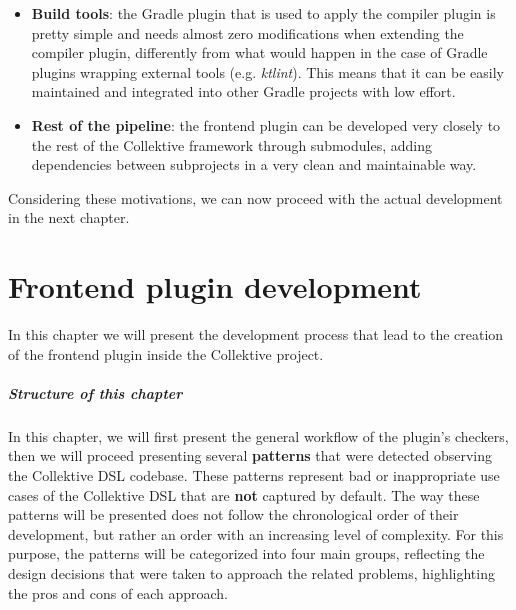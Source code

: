 \documentclass[12pt,a4paper,openright,twoside]{book}
\begin{document}
\begin{enumerate}
\begin{itemize}
    \item \textbf{Build tools}: the Gradle plugin that is used to apply the
    compiler plugin is pretty simple and needs almost zero modifications when
    extending the compiler plugin, differently from what would happen in the
    case of Gradle plugins wrapping external tools (e.g. \emph{ktlint}). This
    means that it can be easily maintained and integrated into other Gradle
    projects with low effort.

    \item \textbf{Rest of the pipeline}: the frontend plugin can be developed 
    very closely to the rest of the Collektive framework through submodules,
    adding dependencies between subprojects in a very clean and maintainable
    way.
  \end{itemize}
\end{enumerate}

Considering these motivations, we can now proceed with the actual development in
the next chapter.

\chapter{Frontend plugin development}
\label{chap:contribution}

In this chapter we will present the development process that lead to the creation of 
the frontend plugin inside the Collektive project.

\paragraph{Structure of this chapter}

In this chapter, we will first present the general workflow of the plugin's
checkers, then we will proceed presenting several \textbf{patterns} that were
detected observing the Collektive DSL codebase. These patterns represent bad or
inappropriate use cases of the Collektive DSL that are \textbf{not} captured by 
default. 
%
The way these patterns will be presented does not follow the chronological order 
of their development, but rather an order with an increasing level of complexity.
For this purpose, the patterns will be categorized into four main groups, 
reflecting the design decisions that were taken to approach the related problems,
highlighting the pros and cons of each approach. 
\end{document}
